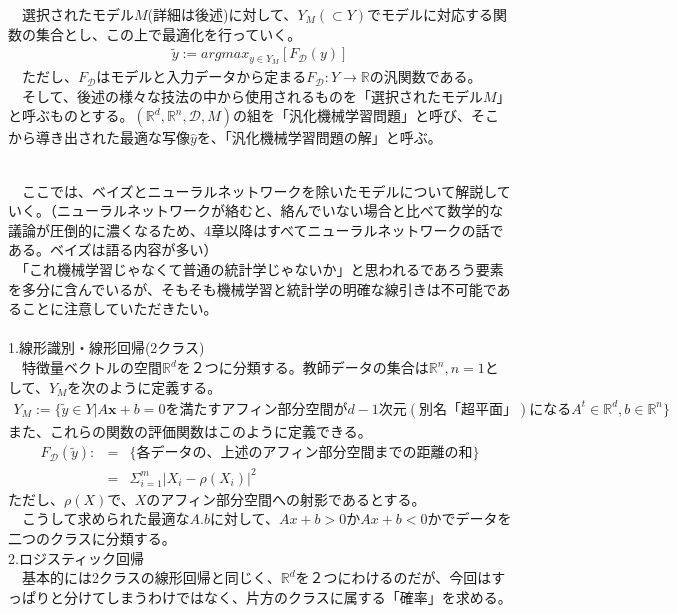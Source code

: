 \documentclass{jsarticle}
\begin{document}
　選択されたモデル$M$(詳細は後述)に対して、$Y_M(\subset Y)$でモデルに対応する関数の集合とし、この上で最適化を行っていく。\\
\begin{eqnarray}
\tilde{y}:=argmax_{y\in Y_M}[F_\mathcal{D}(y)]
\end{eqnarray}
　ただし、$F_\mathcal{D}$はモデルと入力データから定まる$F_\mathcal{D}:Y\rightarrow\mathbb{R}$の汎関数である。\\
　そして、後述の様々な技法の中から使用されるものを「選択されたモデル$M$」と呼ぶものとする。$(\mathbb{R}^d,\mathbb{R}^n,\mathcal{D},M)$の組を「汎化機械学習問題」と呼び、そこから導き出された最適な写像$\hat{y}$を、「汎化機械学習問題の解」と呼ぶ。

\newpage
\scalebox{1.1}{2.モデル設定}\\
　ここでは、ベイズとニューラルネットワークを除いたモデルについて解説していく。（ニューラルネットワークが絡むと、絡んでいない場合と比べて数学的な議論が圧倒的に濃くなるため、4章以降はすべてニューラルネットワークの話である。ベイズは語る内容が多い）\\
　「これ機械学習じゃなくて普通の統計学じゃないか」と思われるであろう要素を多分に含んでいるが、そもそも機械学習と統計学の明確な線引きは不可能であることに注意していただきたい。\\
　\\
1.線形識別・線形回帰(2クラス)\\
　特徴量ベクトルの空間$\mathbb{R}^d$を２つに分類する。教師データの集合は$\mathbb{R}^n,n=1$として、$Y_M$を次のように定義する。
\begin{eqnarray}
Y_M:=\{\tilde{y}\in Y|A\bm{x}+b=0を満たすアフィン部分空間がd-1次元(別名「超平面」)になるA^t\in \mathbb{R}^d,b\in\mathbb{R}^n \}
\end{eqnarray}
また、これらの関数の評価関数はこのように定義できる。
\begin{eqnarray}
F_\mathcal{D}(\tilde{y}):&=&\{各データの、上述のアフィン部分空間までの距離の和\}\nonumber\\
&=&\Sigma_{i=1}^m |X_i-\rho(X_i)|^2
\end{eqnarray}
ただし、$\rho(X)$で、$X$のアフィン部分空間への射影であるとする。\\
　こうして求められた最適な$A.b$に対して、$Ax+b>0$か$Ax+b<0$かでデータを二つのクラスに分類する。
　\\
2.ロジスティック回帰\\
　基本的には2クラスの線形回帰と同じく、$\mathbb{R}^d$を２つにわけるのだが、今回はすっぱりと分けてしまうわけではなく、片方のクラスに属する「確率」を求める。\\
 
\end{document}
